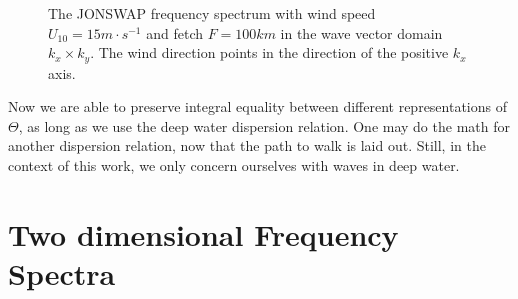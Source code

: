 %
\begin{figure}
\centering
{}
\caption{The JONSWAP frequency spectrum with wind speed $U_{10} = 15m\cdot 
s^{-1}$ and fetch $F = 100km$ in the wave vector domain $k_x \times k_y$. The 
wind direction points in the direction of the positive $k_x$ axis.}
\label{fig:jonswap_3d_kx_ky}
\end{figure}
%
Now we are able to preserve integral equality between different representations 
of $\Theta$, as long as we use the deep water dispersion relation. One may do 
the math for another dispersion relation, now that the path to walk is laid 
out. Still, in the context of this work, we only concern ourselves with waves 
in deep water.
%
\section{Two dimensional Frequency Spectra}

